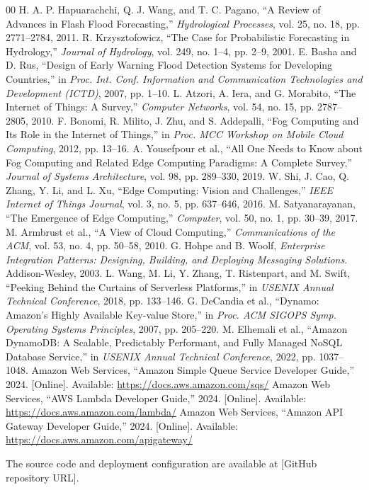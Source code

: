 \documentclass[conference]{IEEEtran}
\begin{document}
\begin{thebibliography}{00}
 H. A. P. Hapuarachchi, Q. J. Wang, and T. C. Pagano, ``A Review of Advances in Flash Flood Forecasting,'' \emph{Hydrological Processes}, vol. 25, no. 18, pp. 2771--2784, 2011.
 R. Krzysztofowicz, ``The Case for Probabilistic Forecasting in Hydrology,'' \emph{Journal of Hydrology}, vol. 249, no. 1--4, pp. 2--9, 2001.
 E. Basha and D. Rus, ``Design of Early Warning Flood Detection Systems for Developing Countries,'' in \emph{Proc. Int. Conf. Information and Communication Technologies and Development (ICTD)}, 2007, pp. 1--10.
 L. Atzori, A. Iera, and G. Morabito, ``The Internet of Things: A Survey,'' \emph{Computer Networks}, vol. 54, no. 15, pp. 2787--2805, 2010.
 F. Bonomi, R. Milito, J. Zhu, and S. Addepalli, ``Fog Computing and Its Role in the Internet of Things,'' in \emph{Proc. MCC Workshop on Mobile Cloud Computing}, 2012, pp. 13--16.
 A. Yousefpour et al., ``All One Needs to Know about Fog Computing and Related Edge Computing Paradigms: A Complete Survey,'' \emph{Journal of Systems Architecture}, vol. 98, pp. 289--330, 2019.
 W. Shi, J. Cao, Q. Zhang, Y. Li, and L. Xu, ``Edge Computing: Vision and Challenges,'' \emph{IEEE Internet of Things Journal}, vol. 3, no. 5, pp. 637--646, 2016.
 M. Satyanarayanan, ``The Emergence of Edge Computing,'' \emph{Computer}, vol. 50, no. 1, pp. 30--39, 2017.
 M. Armbrust et al., ``A View of Cloud Computing,'' \emph{Communications of the ACM}, vol. 53, no. 4, pp. 50--58, 2010.
 G. Hohpe and B. Woolf, \emph{Enterprise Integration Patterns: Designing, Building, and Deploying Messaging Solutions}. Addison-Wesley, 2003.
 L. Wang, M. Li, Y. Zhang, T. Ristenpart, and M. Swift, ``Peeking Behind the Curtains of Serverless Platforms,'' in \emph{USENIX Annual Technical Conference}, 2018, pp. 133--146.
 G. DeCandia et al., ``Dynamo: Amazon's Highly Available Key-value Store,'' in \emph{Proc. ACM SIGOPS Symp. Operating Systems Principles}, 2007, pp. 205--220.
 M. Elhemali et al., ``Amazon DynamoDB: A Scalable, Predictably Performant, and Fully Managed NoSQL Database Service,'' in \emph{USENIX Annual Technical Conference}, 2022, pp. 1037--1048.
 Amazon Web Services, ``Amazon Simple Queue Service Developer Guide,'' 2024. [Online]. Available: \url{https://docs.aws.amazon.com/sqs/}
 Amazon Web Services, ``AWS Lambda Developer Guide,'' 2024. [Online]. Available: \url{https://docs.aws.amazon.com/lambda/}
 Amazon Web Services, ``Amazon API Gateway Developer Guide,'' 2024. [Online]. Available: \url{https://docs.aws.amazon.com/apigateway/}
\end{thebibliography}

The source code and deployment configuration are available at [GitHub repository URL].
\end{document}
